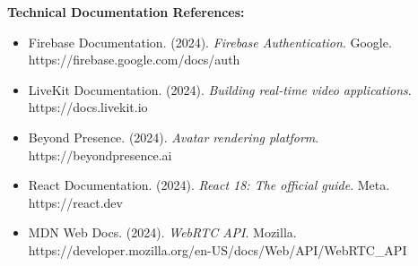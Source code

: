 \documentclass[11pt,a4paper]{report}
\begin{document}
\vspace{0.5cm}
\noindent\textbf{Technical Documentation References:}

\begin{itemize}[leftmargin=1.5cm, itemsep=2pt, parsep=0pt]
\item Firebase Documentation. (2024). \textit{Firebase Authentication}. Google. https://firebase.google.com/docs/auth
\item LiveKit Documentation. (2024). \textit{Building real-time video applications}. https://docs.livekit.io
\item Beyond Presence. (2024). \textit{Avatar rendering platform}. https://beyondpresence.ai
\item React Documentation. (2024). \textit{React 18: The official guide}. Meta. https://react.dev
\item MDN Web Docs. (2024). \textit{WebRTC API}. Mozilla. https://developer.mozilla.org/en-US/docs/Web/API/WebRTC\_API
\end{itemize}
\end{document}
